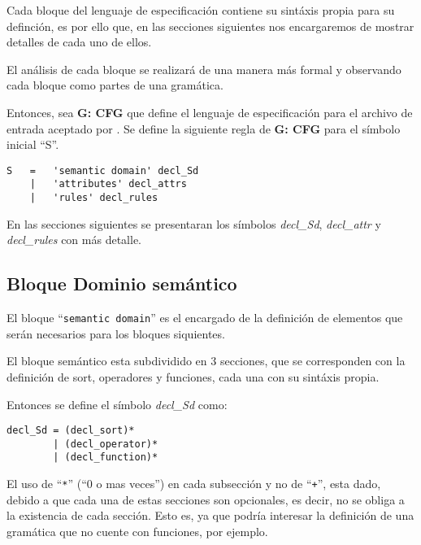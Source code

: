 Cada bloque del lenguaje de especificación contiene su sintáxis propia para su definción, es por ello que, en las secciones siguientes nos encargaremos de mostrar detalles de cada uno de ellos.

El análisis de cada bloque se realizará de una manera más formal y observando cada bloque como partes de una gramática.

Entonces, sea \textbf{G: CFG} que define el lenguaje de especificación para el archivo de entrada aceptado por \maggen. Se define la siguiente regla de \textbf{G: CFG} para el símbolo inicial ``S''.

\begin{center}
\lstset{language=inform}
\begin{lstlisting}
S   =   'semantic domain' decl_Sd
    |   'attributes' decl_attrs
    |   'rules' decl_rules
\end{lstlisting}
\end{center}

En las secciones siguientes se presentaran los símbolos \textit{decl\_Sd}, \textit{decl\_attr} y \textit{decl\_rules} con más detalle.  

\subsection{Bloque Dominio semántico}

El bloque ``\texttt{semantic domain}'' es el encargado de la definición de elementos que serán necesarios para los bloques siquientes. 

El bloque semántico esta subdividido en 3 secciones, que se corresponden con la definición de sort, operadores y funciones, cada una con su sintáxis propia. 

Entonces se define el símbolo \textit{decl\_Sd} como:

\begin{center}
\lstset{language=inform}
\begin{lstlisting}
decl_Sd = (decl_sort)*
        | (decl_operator)*
        | (decl_function)*
\end{lstlisting}
\end{center}

El uso de ``\texttt{*}'' (``0 o mas veces'') en cada subsección y no de ``\texttt{+}'', esta dado, debido a que cada una de estas secciones son opcionales, es decir, no se obliga a la existencia de cada sección. Esto es, ya que podría interesar la definición de una gramática que no cuente con funciones, por ejemplo.

